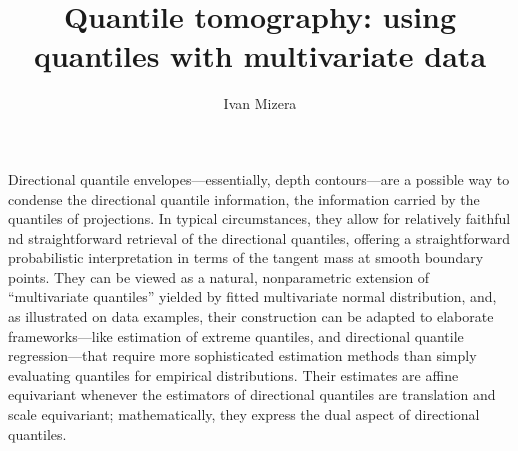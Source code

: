 \documentclass[12pt]{amsart}
\begin{document}
\title{Quantile tomography: using quantiles with multivariate data}
\author{Ivan Mizera}
\address{University of Alberta}
\maketitle
Directional quantile envelopes---essentially, depth contours---are a possible way to condense the directional quantile information, the information carried by the quantiles of projections. In typical circumstances, they allow for relatively faithful nd straightforward retrieval of the directional quantiles, offering a straightforward probabilistic interpretation in terms of the tangent mass at smooth boundary points. They can be viewed as a natural, nonparametric extension of ``multivariate quantiles'' yielded by fitted multivariate normal distribution, and, as illustrated on data examples, their construction can be adapted to elaborate frameworks---like estimation of extreme quantiles, and directional quantile regression---that require more sophisticated estimation methods than simply evaluating quantiles for empirical distributions. Their estimates are affine equivariant whenever the estimators of directional quantiles are translation and scale equivariant; mathematically, they express the dual aspect of directional quantiles.
\end{document}
